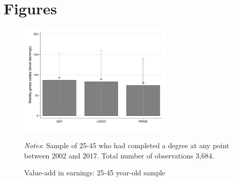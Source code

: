 \documentclass[12pt, a4paper]{article}
\begin{document}

\section{Figures}
%
%

\begin{figure}[H]
\centering
\caption{Value-add in earnings: 25-45 year-old sample}
\vspace{0.5cm}
  \label{fig:valadle46}
    \includegraphics[width=0.65\textwidth]{_figures/valad_levearn_46.pdf}
\parbox{1\textwidth}{\footnotesize{\textit{Notes}: Sample of 25-45 who had completed a degree at any point between 2002 and 2017. Total number of observations 3,684.}}
\end{figure}
\end{document}
